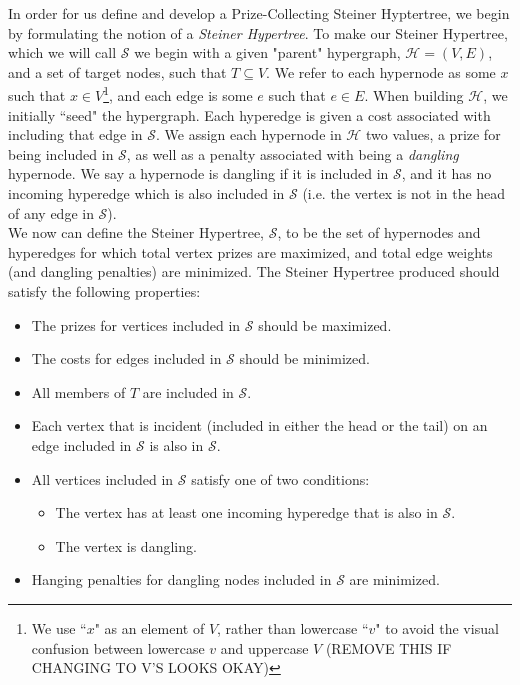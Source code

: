 \documentclass[12pt,twoside]{reedthesis}
\begin{document}
In order for us define and develop a Prize-Collecting Steiner Hyptertree, we begin by formulating the notion of a \textit{Steiner Hypertree}.  To make our Steiner Hypertree, which we will call $\mathcal{S}$ we begin with a given "parent" hypergraph, $\mathcal{H} = (V,E)$, and a set of target nodes, such that $T \subseteq V$.  We refer to each hypernode as some $x$ such that $x \in V$\footnote{We use ``$x$" as an element of $V$, rather than lowercase ``$v$" to avoid the visual confusion between lowercase $v$ and uppercase $V$ (REMOVE THIS IF CHANGING TO V'S LOOKS OKAY)}, and each edge is some $e$ such that $e \in E$.  When building $\mathcal{H}$, we initially ``seed" the hypergraph.  Each hyperedge is given a cost associated with including that edge in $\mathcal{S}$.  We assign each hypernode in $\mathcal{H}$ two values, a prize for being included in $\mathcal{S}$, as well as a penalty associated with being a \textit{dangling} hypernode.  We say a hypernode is dangling if it is included in $\mathcal{S}$, and it has no incoming hyperedge which is also included in $\mathcal{S}$ (i.e. the vertex is not in the head of any edge in $\mathcal{S}$).\\

We now can define the Steiner Hypertree, $\mathcal{S}$, to be the set of hypernodes and hyperedges for which total vertex prizes are maximized, and total edge weights (and dangling penalties) are minimized.  The Steiner Hypertree produced should satisfy the following properties:

\begin{itemize}
	\item The prizes for vertices included in $\mathcal{S}$ should be maximized.
	\item The costs for edges included in $\mathcal{S}$ should be minimized.
	\item All members of $T$ are included in $\mathcal{S}$.
	\item Each vertex that is incident (included in either the head or the tail) on an edge included in $\mathcal{S}$ is also in $\mathcal{S}$. 
	\item All vertices included in $\mathcal{S}$ satisfy one of two conditions:
	\begin{itemize}
		\item The vertex has at least one incoming hyperedge that is also in $\mathcal{S}$.
		\item The vertex is dangling.
	\end{itemize}
	\item Hanging penalties for dangling nodes included in $\mathcal{S}$ are minimized.
\end{itemize}
\end{document}
